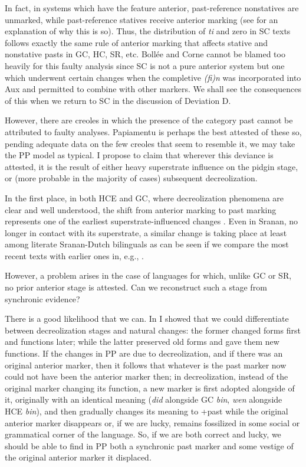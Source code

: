 In fact, in systems which have the feature anterior, past-reference nonstatives are unmarked, while past-reference statives receive anterior
marking (see \citet[Chapter 2]{Bickerton1975} for an explanation of why this is so). Thus, the distribution of \textit{ti} and zero in SC texts follows exactly the same rule of anterior marking that affects stative and nonstative pasts in GC, HC, SR, etc.
Bollée and Corne cannot be blamed too heavily for this faulty analysis since SC is not a pure anterior system but one which under\-went certain changes when the completive \textit{(fi)n} was incorporated into Aux and permitted to combine with other markers. We shall see the consequences of this when we return to SC in the discussion of Deviation D.

However, there are creoles in which the presence of the category past cannot be attributed to faulty analyses. Papiamentu is perhaps the best attested of these so, pending adequate data on the few creoles that seem to resemble it, we may take the PP model as typical. I pro\-pose to claim that wherever this deviance is attested, it is the result of either heavy superstrate influence on the pidgin stage, or (more prob\-able in the majority of cases) subsequent decreolization.

In the first place, in both HCE and GC, where decreolization phenomena are clear and well understood, the shift from anterior mark\-ing to past marking represents one of the earliest superstrate-influenced changes \citep{Bickerton1975,Bickerton1977}. Even in Sranan, no longer in contact with its superstrate, a similar change is taking place at least among literate Sranan-Dutch bilinguals as can be seen if we compare the most recent texts with earlier ones in, e.g., \citet{Voorhoeve1976}.

However, a problem arises in the case of languages for which, unlike GC or SR, no prior anterior stage is attested. Can we reconstruct such a stage from synchronic evidence?

There is a good likelihood that we can. In \citet{Bickerton1980} I showed that we could differentiate between decreolization stages and natural changes: the former changed forms first and functions later; while the latter preserved old forms and gave them new functions. If the changes in PP are due to decreolization, and if there was an original anterior marker, then it follows that whatever is the past
marker now could not have been the anterior marker then; in decreoli\-zation, instead of the original marker changing its function, a new marker is first adopted alongside of it, originally with an identical meaning (\textit{did} alongside GC \textit{bin}, \textit{wen} alongside HCE \textit{bin}), and then gradually changes its meaning to +past while the original anterior marker disappears or, if we are lucky, remains fossilized in some social or grammatical corner of the language. So, if we are both correct and lucky, we should be able to find in PP both a synchronic past marker and some vestige of the original anterior marker it displaced.

